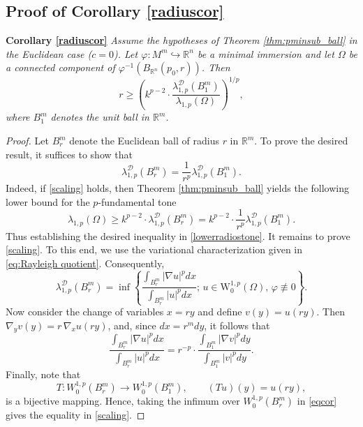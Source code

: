 \documentclass{article}
\begin{document}
\subsection{Proof of Corollary \ref{radiuscor}}
\textbf{Corollary \ref{radiuscor}}
\textit{Assume the hypotheses of Theorem \ref{thm:pminsub_ball}
in the Euclidean case ($c=0$).
Let $\varphi : M^m \hookrightarrow \mathbb{R}^n$ be a minimal immersion and let 
$\Omega$ be a connected component of 
$\varphi^{-1}(B_{\mathbb{R}^n}(p_0,r))$.
Then
\begin{equation}\label{lowerradiostone}
r \geq \left( k^{p-2} \cdot \frac{\lambda_{1,p}^{\mathcal D}(B_1^m)}{\lambda_{1,p}(\Omega)}\right)^{1/p},
\end{equation}
where $B_1^m$ denotes the unit ball in $\mathbb{R}^m$.}

\begin{proof}
Let $B_r^{m}$ denote the Euclidean ball of radius $r$ in $\mathbb{R}^{m}$. To prove the desired result, it suffices to show that
\begin{equation}\label{scaling}
    \lambda_{1,p}^{\mathcal{D}}(B^{m}_r) = \frac{1}{r^p}\lambda_{1,p}^{\mathcal D}(B_1^m).
\end{equation}
Indeed, if \eqref{scaling} holds, then Theorem \ref{thm:pminsub_ball}
yields the following lower bound for the $p$-fundamental tone
\begin{equation}
    \lambda_{1,p}(\Omega) \geq k^{p-2} \cdot \lambda_{1,p}^{\mathcal{D}}(B^{m}_r) = k^{p-2} \cdot \frac{1}{r^p}\lambda_{1,p}^{\mathcal D}(B_1^m).
\end{equation}
Thus establishing the desired inequality in \eqref{lowerradiostone}.
It remains to prove \eqref{scaling}. To this end, we use the variational
characterization given in \eqref{eq:Rayleigh quotient}. Consequently,
\begin{equation}
      \lambda_{1,p}^{\mathcal{D}}(B^{m}_r)
    = \inf \left\{ \frac{\displaystyle \int_{B^{m}_r} |\nabla u |^p dx} {\displaystyle \int_{B^{m}_r} |u|^p dx}; \, u \in \mathrm{W}^{1,p}_0(\Omega), \, \varphi \not\equiv 0
    \right\}.
\end{equation}
Now consider the change of variables $x=ry$ and define $v(y)=u(ry)$. Then
$\nabla_y v(y)= r\, \nabla_x u(ry)$, and, since $dx = r^{m}dy$, it follows that 
\begin{equation}\label{eqcor}
     \frac{\displaystyle \int_{B^{m}_r} |\nabla u |^p dx} {\displaystyle \int_{B^{m}_r} |u|^p dx} =  r^{-p} \cdot\frac{\displaystyle \int_{B^{m}_1} |\nabla v |^p dy} {\displaystyle \int_{B^{m}_1} |v|^p dy}.
\end{equation}
Finally, note that 
\[
T\colon W^{1,p}_0(B_r^{m}) \to W^{1,p}_0(B_1^{m}), 
\qquad (Tu)(y) = u(ry),
\]
is a bijective mapping. Hence, taking the infimum over 
$W^{1,p}_0(B_r^{m})$ in \eqref{eqcor} gives the equality in \eqref{scaling}.
\end{proof}
\end{document}
